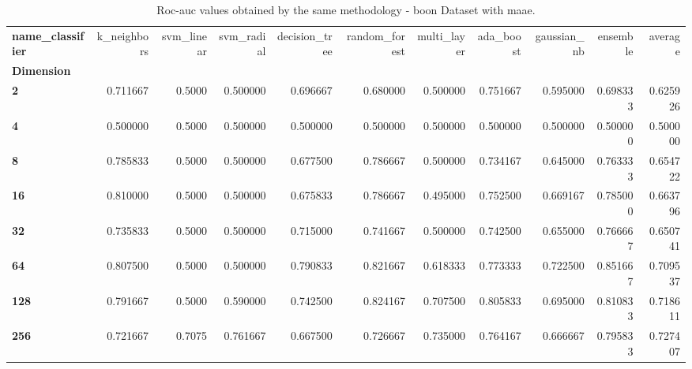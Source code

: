 \begin{table}
\centering
\caption{Roc-auc values obtained by the same methodology - boon Dataset with maae.}
\label{roc-auc_boon_maae-reproduction}
\begin{tabular}{lrrrrrrrrrr}
\toprule
\textbf{name\_classifier} &  k\_neighbors &  svm\_linear &  svm\_radial &  decision\_tree &  random\_forest &  multi\_layer &  ada\_boost &  gaussian\_nb &  ensemble &   average \\
\textbf{Dimension} &              &             &             &                &                &              &            &              &           &           \\
\midrule
\textbf{2        } &     0.711667 &      0.5000 &    0.500000 &       0.696667 &       0.680000 &     0.500000 &   0.751667 &     0.595000 &  0.698333 &  0.625926 \\
\textbf{4        } &     0.500000 &      0.5000 &    0.500000 &       0.500000 &       0.500000 &     0.500000 &   0.500000 &     0.500000 &  0.500000 &  0.500000 \\
\textbf{8        } &     0.785833 &      0.5000 &    0.500000 &       0.677500 &       0.786667 &     0.500000 &   0.734167 &     0.645000 &  0.763333 &  0.654722 \\
\textbf{16       } &     0.810000 &      0.5000 &    0.500000 &       0.675833 &       0.786667 &     0.495000 &   0.752500 &     0.669167 &  0.785000 &  0.663796 \\
\textbf{32       } &     0.735833 &      0.5000 &    0.500000 &       0.715000 &       0.741667 &     0.500000 &   0.742500 &     0.655000 &  0.766667 &  0.650741 \\
\textbf{64       } &     0.807500 &      0.5000 &    0.500000 &       0.790833 &       0.821667 &     0.618333 &   0.773333 &     0.722500 &  0.851667 &  0.709537 \\
\textbf{128      } &     0.791667 &      0.5000 &    0.590000 &       0.742500 &       0.824167 &     0.707500 &   0.805833 &     0.695000 &  0.810833 &  0.718611 \\
\textbf{256      } &     0.721667 &      0.7075 &    0.761667 &       0.667500 &       0.726667 &     0.735000 &   0.764167 &     0.666667 &  0.795833 &  0.727407 \\
\bottomrule
\end{tabular}
\end{table}

